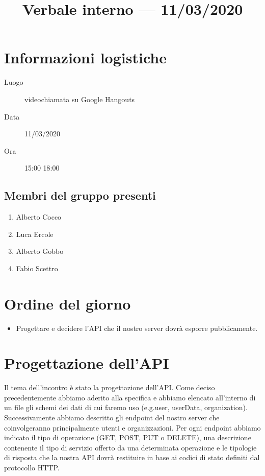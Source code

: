 \documentclass{article}
\title{Verbale interno --- 11/03/2020}
\begin{document}


\section{Informazioni logistiche}%
\label{sec:informazioni_logistiche}

\begin{description}
  \item [Luogo] videochiamata su Google Hangouts
  \item [Data] 11/03/2020
  \item [Ora] 15:00  18:00
\end{description}

\subsection{Membri del gruppo presenti}%
\label{sub:membri_del_gruppo_presenti}

\begin{enumerate}
  \item Alberto Cocco
  \item Luca Ercole
  \item Alberto Gobbo
  \item Fabio Scettro
\end{enumerate}

\section{Ordine del giorno}%
\label{sec:ordine_del_giorno}

\begin{itemize}
  \item Progettare e decidere l'API che il nostro server dovrà esporre pubblicamente.
\end{itemize}

\section{Progettazione dell'API}%
\label{sec:progettazione_API}

Il tema dell'incontro è stato la progettazione dell'API\@.
Come deciso precedentemente abbiamo aderito alla specifica  e abbiamo elencato all'interno di un file  gli schemi  dei dati di cui faremo uso (e.g.user, userData, organization).
Successivamente abbiamo descritto gli endpoint del nostro server che coinvolgeranno principalmente utenti e organizzazioni.
Per ogni endpoint abbiamo indicato il tipo di operazione (GET, POST, PUT o DELETE), una descrizione contenente il tipo di servizio offerto da una determinata operazione e le tipologie di risposta che la nostra API dovrà restituire in base ai codici di stato definiti dal protocollo HTTP\@.
\newpage
\end{document}
